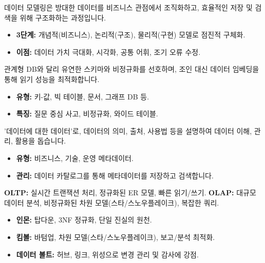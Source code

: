 \documentclass[11pt,a4paper]{article}
\theoremstyle{definition}
\begin{document}
\begin{tcolorbox}[summary, title=데이터 모델링의 핵심]
데이터 모델링은 방대한 데이터를 비즈니스 관점에서 조직화하고, 효율적인 저장 및 검색을 위해 구조화하는 과정입니다.
\begin{itemize}
    \item \textbf{3단계:} 개념적(비즈니스), 논리적(구조), 물리적(구현) 모델로 점진적 구체화.
    \item \textbf{이점:} 데이터 가치 극대화, 시각화, 공통 어휘, 조기 오류 수정.
\end{itemize}
\end{tcolorbox}

\begin{tcolorbox}[summary, title=NoSQL 모델링]
관계형 DB와 달리 유연한 스키마와 비정규화를 선호하며, 조인 대신 데이터 임베딩을 통해 읽기 성능을 최적화합니다.
\begin{itemize}
    \item \textbf{유형:} 키-값, 빅 테이블, 문서, 그래프 DB 등.
    \item \textbf{특징:} 질문 중심 사고, 비정규화, 와이드 테이블.
\end{itemize}
\end{tcolorbox}

\begin{tcolorbox}[summary, title=메타데이터의 중요성]
'데이터에 대한 데이터'로, 데이터의 의미, 출처, 사용법 등을 설명하여 데이터 이해, 관리, 활용을 돕습니다.
\begin{itemize}
    \item \textbf{유형:} 비즈니스, 기술, 운영 메타데이터.
    \item \textbf{관리:} 데이터 카탈로그를 통해 메타데이터를 저장하고 검색합니다.
\end{itemize}
\end{tcolorbox}

\begin{tcolorbox}[summary, title=OLTP vs. OLAP]
\textbf{OLTP:} 실시간 트랜잭션 처리, 정규화된 ER 모델, 빠른 읽기/쓰기.
\textbf{OLAP:} 대규모 데이터 분석, 비정규화된 차원 모델(스타/스노우플레이크), 복잡한 쿼리.
\end{tcolorbox}

\begin{tcolorbox}[summary, title=데이터 웨어하우스 모델링]
\begin{itemize}
    \item \textbf{인몬:} 탑다운, 3NF 정규화, 단일 진실의 원천.
    \item \textbf{킴볼:} 바텀업, 차원 모델(스타/스노우플레이크), 보고/분석 최적화.
    \item \textbf{데이터 볼트:} 허브, 링크, 위성으로 변경 관리 및 감사에 강점.
\end{itemize}
\end{tcolorbox}
\end{document}
